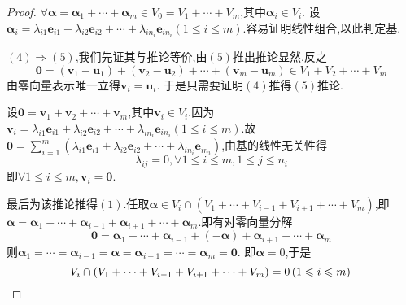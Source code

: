 {\begin{proof}
        $\forall \bm{\alpha}=\bm{\alpha}_1+\cdots+\bm{\alpha}_m\in V_0=
            V_1+\cdots+V_m$,其中$\bm{\alpha}_i\in V_i.$
        设$\bm{\alpha}_i=
            \lambda_{i1}\bm{e}_{i1}+\lambda_{i2}\bm{e}_{i2}+\cdots+\lambda_{in_i}
            \bm{e}_{in_i}\left(1\leqslant i \leqslant m\right)$.容易证明线性组合,以此判定基.

        $(4)\Longrightarrow (5)$,我们先证其与推论等价,由$(5)$推出推论显然.反之
        \[
            \bm{0}=\left(\bm{v}_1-\bm{u}_1\right)+\left(
            \bm{v}_2-\bm{u}_2
            \right)+\cdots+\left(\bm{v}_m-\bm{u}_m\right)\in V_1+V_2+\cdots+V_m
        \]
        由零向量表示唯一立得$\bm{v}_i=\bm{u}_i.$
        于是只需要证明$(4)$推得$(5)$推论.

        设$\bm{0}=\bm{v}_1+\bm{v}_2+\cdots+\bm{v}_m$,其中$\bm{v}_i\in V_i.$因为
        $\bm{v}_i=
            \lambda_{i1}\bm{e}_{i1}+\lambda_{i2}\bm{e}_{i2}+\cdots+\lambda_{in_i}
            \bm{e}_{in_i}\left(
            1\leqslant i\leqslant m
            \right)$.故
        $\displaystyle
            \bm{0}=\sum_{i=1}^{m}\left(
            \lambda_{i1}\bm{e}_{i1}+\lambda_{i2}\bm{e}_{i2}+\cdots+\lambda_{in_i}
            \bm{e}_{in_i}
            \right)$,由基的线性无关性得
        \[
            \lambda_{ij}=0,\forall 1\leqslant i\leqslant m,1\leqslant j\leqslant n_i
        \]
        即$\forall 1\leqslant i\leqslant m,\bm{v}_i=\bm{0}$.

        最后为该推论推得$(1)$.任取$
            \bm{\alpha}\in V_i\cap \left(V_1+\cdots+V_{i-1}+V_{i+1}+\cdots+
            V_m\right)$,即$\bm{\alpha}=\bm{\alpha}_1+\cdots+\bm{\alpha}_{i-1}+\bm{\alpha}_{i+1}+\cdots+\bm{\alpha}_m$.即有对零向量分解
        \[
            \bm{0}=\bm{\alpha}_1+\cdots
            +\bm{\alpha}_{i-1}+\left(-\bm{\alpha}
            \right)+\bm{\alpha}_{i+1}+\cdots+\bm{\alpha}_m
        \]
        则$\bm{\alpha}_1=\cdots=\bm{\alpha}_{i-1}=\bm{\alpha}=
            \bm{\alpha}_{i+1}=\cdots=\bm{\alpha}_m=\bm{0}.$
        即$\bm{\alpha}=0$,于是
        \[
            V_i\cap \left(V_1+\cdots+V_{i-1}+V_{i+1}+\cdots+
            V_m\right)=0\left(1\leqslant i\leqslant
            m\right)
            \qedhere
        \]
    \end{proof}
}